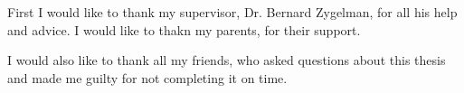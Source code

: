 
First I would like to thank my supervisor, Dr. Bernard Zygelman, for all his help and advice.
I would like to thakn my parents, for their support.

I would also like to thank all my friends, who asked questions about this thesis and made me guilty for not completing it on time.
